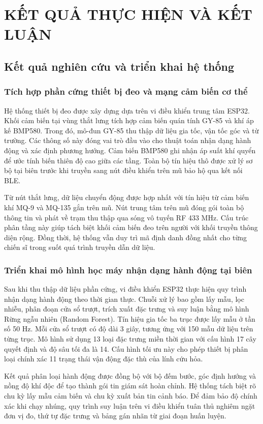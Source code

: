 \chapter{KẾT QUẢ THỰC HIỆN VÀ KẾT LUẬN}\label{ch:ketqua}
\section{Kết quả nghiên cứu và triển khai hệ thống}
\subsection{Tích hợp phần cứng thiết bị đeo và mạng cảm biến cơ thể}
Hệ thống thiết bị đeo được xây dựng dựa trên vi điều khiển trung tâm ESP32. Khối cảm biến tại vùng thắt lưng tích hợp cảm biến quán tính GY-85 và khí áp kế BMP580. Trong đó, mô-đun GY-85 thu thập dữ liệu gia tốc, vận tốc góc và từ trường. Các thông số này đóng vai trò đầu vào cho thuật toán nhận dạng hành động và xác định phương hướng. Cảm biến BMP580 ghi nhận áp suất khí quyển để ước tính biến thiên độ cao giữa các tầng. Toàn bộ tín hiệu thô được xử lý sơ bộ tại biên trước khi truyền sang nút điều khiển trên mũ bảo hộ qua kết nối BLE.

Từ nút thắt lưng, dữ liệu chuyển động được hợp nhất với tín hiệu từ cảm biến khí MQ-9 và MQ-135 gắn trên mũ. Nút trung tâm trên mũ đóng gói toàn bộ thông tin và phát về trạm thu thập qua sóng vô tuyến RF 433 MHz. Cấu trúc phân tầng này giúp tách biệt khối cảm biến đeo trên người với khối truyền thông diện rộng. Đồng thời, hệ thống vẫn duy trì mã định danh đồng nhất cho từng chiến sĩ trong suốt quá trình truyền dẫn dữ liệu.

\subsection{Triển khai mô hình học máy nhận dạng hành động tại biên}
Sau khi thu thập dữ liệu phần cứng, vi điều khiển ESP32 thực hiện quy trình nhận dạng hành động theo thời gian thực. Chuỗi xử lý bao gồm lấy mẫu, lọc nhiễu, phân đoạn cửa sổ trượt, trích xuất đặc trưng và suy luận bằng mô hình Rừng ngẫu nhiên (Random Forest). Tín hiệu gia tốc ba trục được lấy mẫu ở tần số 50 Hz. Mỗi cửa sổ trượt có độ dài 3 giây, tương ứng với 150 mẫu dữ liệu trên từng trục. Mô hình sử dụng 13 loại đặc trưng miền thời gian với cấu hình 17 cây quyết định và độ sâu tối đa là 14. Cấu hình tối ưu này cho phép thiết bị phân loại chính xác 11 trạng thái vận động đặc thù của lính cứu hỏa.

Kết quả phân loại hành động được đồng bộ với bộ đếm bước, góc định hướng và nồng độ khí độc để tạo thành gói tin giám sát hoàn chỉnh. Hệ thống tách biệt rõ chu kỳ lấy mẫu cảm biến và chu kỳ xuất bản tin cảnh báo. Để đảm bảo độ chính xác khi chạy nhúng, quy trình suy luận trên vi điều khiển tuân thủ nghiêm ngặt đơn vị đo, thứ tự đặc trưng và bảng gán nhãn từ giai đoạn huấn luyện.

